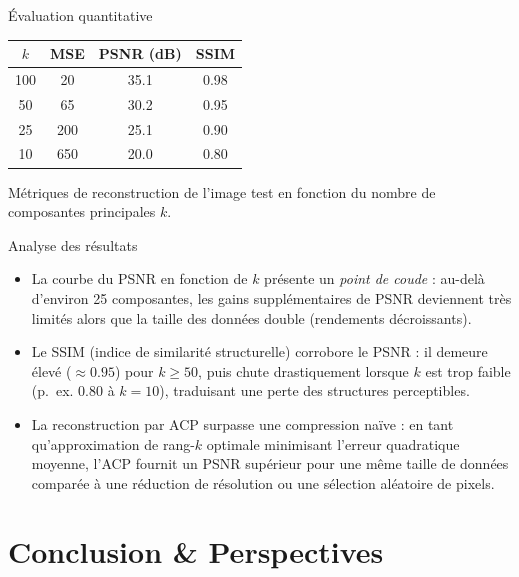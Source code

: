 \documentclass{beamer}
\begin{document}
\begin{frame}{Évaluation quantitative}
\begin{center}
\small
\begin{tabular}{c|c|c|c}
$k$ & MSE & PSNR (dB) & SSIM \\
\hline
100 & 20 & 35.1 & 0.98 \\
50 & 65 & 30.2 & 0.95 \\
25 & 200 & 25.1 & 0.90 \\
10 & 650 & 20.0 & 0.80 \\
\end{tabular}
\end{center}
\vspace{0.2cm}
\footnotesize{Métriques de reconstruction de l'image test en fonction du nombre de composantes principales $k$.}
\end{frame}

\begin{frame}{Analyse des résultats}
\begin{itemize}
  \item La courbe du PSNR en fonction de $k$ présente un \textit{point de coude} : au-delà d’environ 25 composantes, les gains supplémentaires de PSNR deviennent très limités alors que la taille des données double (rendements décroissants).
  \item Le SSIM (indice de similarité structurelle) corrobore le PSNR : il demeure élevé ($\approx 0.95$) pour $k \ge 50$, puis chute drastiquement lorsque $k$ est trop faible (p.~ex. $0.80$ à $k=10$), traduisant une perte des structures perceptibles.
  \item La reconstruction par ACP surpasse une compression \og naïve\fg{} : en tant qu’approximation de rang-$k$ optimale minimisant l’erreur quadratique moyenne, l’ACP fournit un PSNR supérieur pour une même taille de données comparée à une réduction de résolution ou une sélection aléatoire de pixels.
\end{itemize}
\end{frame}

\section{Conclusion \& Perspectives}
\end{document}
